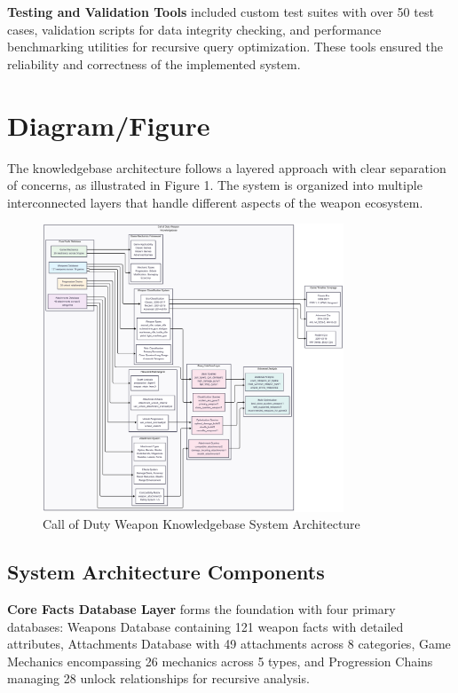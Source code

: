 \documentclass[12pt,a4paper]{article}
\begin{document}
\textbf{Testing and Validation Tools} included custom test suites with over 50 test cases, validation scripts for data integrity checking, and performance benchmarking utilities for recursive query optimization. These tools ensured the reliability and correctness of the implemented system.

\section{Diagram/Figure}

The knowledgebase architecture follows a layered approach with clear separation
of concerns, as illustrated in Figure 1. The system is organized into multiple
interconnected layers that handle different aspects of the weapon ecosystem.


\begin{figure}[H]
    \centering
    \includegraphics[width=0.8\textwidth]{diagrams/diagram_vertical.png}
    \caption{Call of Duty Weapon Knowledgebase System Architecture}
\end{figure}

\subsection{System Architecture Components}

\textbf{Core Facts Database Layer} forms the foundation with four primary databases: Weapons Database containing 121 weapon facts with detailed attributes, Attachments Database with 49 attachments across 8 categories, Game Mechanics encompassing 26 mechanics across 5 types, and Progression Chains managing 28 unlock relationships for recursive analysis.
\end{document}
